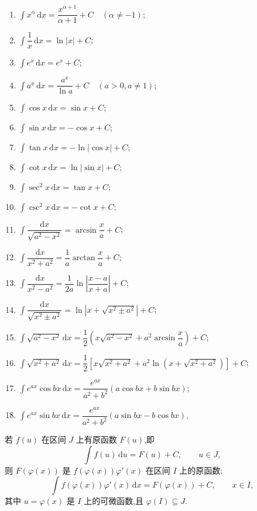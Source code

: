 \documentclass[../数学分析培优讲义.tex]{subfiles}
\begin{document}
\begin{theorem}
\begin{enumerate}[label=(\arabic*)]
    \item $\displaystyle\int x^\alpha\,\mathrm{d}x=\dfrac{x^{\alpha+1}}{\alpha+1}+C\quad(\alpha\neq-1)$;
    \item $\displaystyle\int\dfrac{1}{x}\,\mathrm{d}x=\ln|x|+C$;
    \item $\displaystyle\int e^x\,\mathrm{d}x=e^x+C$;
    \item $\displaystyle\int a^x\,\mathrm{d}x=\dfrac{a^x}{\ln a}+C\quad(a>0,a\neq1)$;
    \item $\displaystyle\int\cos x\,\mathrm{d}x=\sin x+C$;
    \item $\displaystyle\int\sin x\,\mathrm{d}x=-\cos x+C$;
    \item $\displaystyle\int\tan x\,\mathrm{d}x=-\ln|\cos x|+C$;
    \item $\displaystyle\int\cot x\,\mathrm{d}x=\ln|\sin x|+C$;
    \item $\displaystyle\int\sec^2x\,\mathrm{d}x=\tan x+C$;
    \item $\displaystyle\int\csc^2x\,\mathrm{d}x=-\cot x+C$;
    \item $\displaystyle\int\dfrac{\mathrm{d}x}{\sqrt{a^2-x^2}}=\arcsin\dfrac{x}{a}+C$;
    \item $\displaystyle\int\dfrac{\mathrm{d}x}{x^2+a^2}=\dfrac{1}{a}\arctan\dfrac{x}{a}+C$;
    \item $\displaystyle\int\dfrac{\mathrm{d}x}{x^2-a^2}=\dfrac{1}{2a}\ln\left|\dfrac{x-a}{x+a}\right|+C$;
    \item $\displaystyle\int\dfrac{\mathrm{d}x}{\sqrt{x^2\pm a^2}}=\ln\left|x+\sqrt{x^2\pm a^2}\right|+C$;
    \item $\displaystyle\int\sqrt{a^2-x^2}\,\mathrm{d}x
    =\dfrac{1}{2}\left(x\sqrt{a^2-x^2}+a^2\arcsin\dfrac{x}{a}\right)+C$;
    \item $\displaystyle\int\sqrt{x^2+a^2}\,\mathrm{d}x
    =\dfrac{1}{2}\left[x\sqrt{x^2+a^2}+a^2\ln\left(x+\sqrt{x^2+a^2}\right)\right]+C$;
    \item $\displaystyle\int e^{ax}\cos bx\,\mathrm{d}x
    =\dfrac{e^{ax}}{a^2+b^2}(a\cos bx+b\sin bx)$;
    \item $\displaystyle\int e^{ax}\sin bx\,\mathrm{d}x
    =\dfrac{e^{ax}}{a^2+b^2}(a\sin bx-b\cos bx)$.
\end{enumerate}
\end{theorem}

\begin{theorem}[第一积分换元法]
若 $f(u)$ 在区间 $J$ 上有原函数 $F(u)$,即
\[
    \int f(u)\,\mathrm{d}u=F(u)+C,
    \qquad u\in J,
\]
则 $F(\varphi(x))$ 是 $f(\varphi(x))\varphi'(x)$ 在区间 $I$ 上的原函数:
\[
    \int f(\varphi(x))\varphi'(x)\,\mathrm{d}x
    =F(\varphi(x))+C,
    \qquad x\in I,
\]
其中 $u=\varphi(x)$ 是 $I$ 上的可微函数,且 $\varphi(I)\subseteq J$.
\end{theorem}
\end{document}
